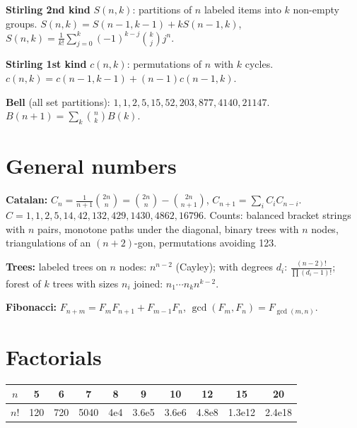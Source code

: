 	\textbf{Stirling 2nd kind} $S(n,k)$: partitions of $n$ labeled items into $k$
	non-empty groups. $S(n,k)=S(n-1,k-1)+kS(n-1,k)$,
	$S(n,k)=\frac1{k!}\sum_{j=0}^k(-1)^{k-j}\binom kj j^n$.

	\textbf{Stirling 1st kind} $c(n,k)$: permutations of $n$ with $k$ cycles.
	$c(n,k)=c(n-1,k-1)+(n-1)c(n-1,k)$.

	\textbf{Bell} (all set partitions): $1,1,2,5,15,52,203,877,4140,21147$.
	$B(n+1)=\sum_k\binom nk B(k)$.

\section{General numbers}
	\textbf{Catalan:} $C_n=\frac1{n+1}\binom{2n}{n}=\binom{2n}{n}-\binom{2n}{n+1}$,
	$C_{n+1}=\sum_i C_iC_{n-i}$. $C = 1,1,2,5,14,42,132,429,1430,4862,16796$.
	Counts: balanced bracket strings with $n$ pairs, monotone paths under the diagonal,
	binary trees with $n$ nodes, triangulations of an $(n+2)$-gon,
	permutations avoiding 123.

	\textbf{Trees:} labeled trees on $n$ nodes: $n^{n-2}$ (Cayley); with degrees $d_i$:
	$\frac{(n-2)!}{\prod(d_i-1)!}$; forest of $k$ trees with sizes $n_i$ joined: $n_1\cdots n_k n^{k-2}$.

	\textbf{Fibonacci:} $F_{n+m}=F_mF_{n+1}+F_{m-1}F_n$, $\gcd(F_m,F_n)=F_{\gcd(m,n)}$.

\section{Factorials}
\begin{tabular}{c|c@{\ }c@{\ }c@{\ }c@{\ }c@{\ }c@{\ }c@{\ }c@{\ }c}
$n$  & 5 & 6 & 7 & 8 & 9 & 10 & 12 & 15 & 20\\
\hline
$n!$ & 120 & 720 & 5040 & 4e4 & 3.6e5 & 3.6e6 & 4.8e8 & 1.3e12 & 2.4e18\\
\end{tabular}
